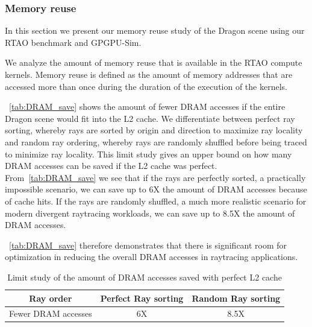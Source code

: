 \subsubsection{Memory reuse}

In this section we present our memory reuse study of the Dragon scene using our RTAO benchmark and GPGPU-Sim. 

We analyze the amount of memory reuse that is available in the RTAO compute kernels. Memory reuse is defined as the amount of memory addresses that are accessed more than once during the duration of the execution of the kernels.

~\autoref{tab:DRAM_save} shows the amount of fewer DRAM accesses if the entire Dragon scene would fit into the L2 cache. We differentiate between perfect ray sorting, whereby rays are sorted by origin and direction to maximize ray locality and random ray ordering, whereby rays are randomly shuffled before being traced to minimize ray locality. 
This limit study gives an upper bound on how many DRAM accesses can be saved if the L2 cache was perfect. From~\autoref{tab:DRAM_save} we see that if the rays are perfectly sorted, a practically impossible scenario, we can save up to 6X the amount of DRAM accesses because of cache hits. If the rays are randomly shuffled, a much more realistic scenario for modern divergent raytracing workloads, we can save up to 8.5X the amount of DRAM accesses.

~\autoref{tab:DRAM_save} therefore demonstrates that there is significant room for optimization in reducing the overall DRAM accesses in raytracing applications. 


\begin{table}[t]
\centering
\begin{tabular}{ |c||c|c|  }
 \hline
 Ray order & Perfect Ray sorting & Random Ray sorting \\
 \hline
    Fewer DRAM accesses  & 6X   &  8.5X \\
  \hline
 \end{tabular}
\caption{\label{tab:DRAM_save} Limit study of the amount of DRAM accesses saved with perfect L2 cache}
\end{table}

